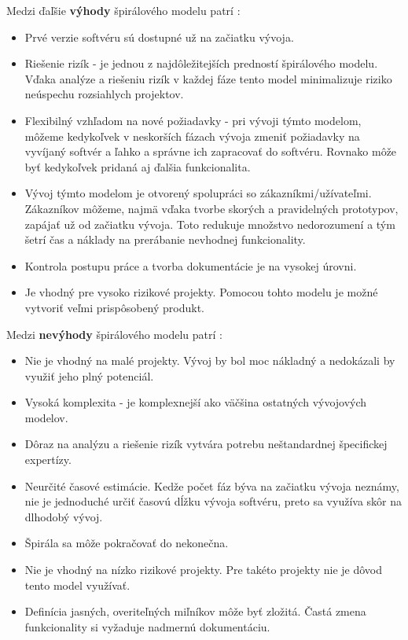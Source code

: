 \documentclass[10pt,twoside,slovak,a4paper]{article}
\begin{document}
Medzi ďaľšie \textbf{výhody} špirálového modelu patrí \cite{SpiralModelProsCons} :
\begin{itemize}
\item Prvé verzie softvéru sú dostupné už na začiatku vývoja.
\item Riešenie rizík - je jednou z najdôležitejších predností špirálového modelu. Vďaka analýze a riešeniu rizík v každej fáze tento model minimalizuje riziko neúspechu rozsiahlych projektov.
\item Flexibilný vzhľadom na nové požiadavky - pri vývoji týmto modelom, môžeme kedykoľvek v neskorších fázach vývoja zmeniť požiadavky na vyvíjaný softvér a ľahko a správne ich zapracovať do softvéru. Rovnako môže byť kedykoľvek pridaná aj ďalšia funkcionalita.
\item Vývoj týmto modelom je otvorený spolupráci so zákazníkmi/užívateľmi. Zákazníkov môžeme, najmä vďaka tvorbe skorých a pravidelných prototypov, zapájať už od začiatku vývoja. Toto redukuje množstvo nedorozumení a tým šetrí čas a náklady na prerábanie nevhodnej funkcionality.
\item Kontrola postupu práce a tvorba dokumentácie je na vysokej úrovni.
\item Je vhodný pre vysoko rizikové projekty. Pomocou tohto modelu je možné vytvoriť veľmi prispôsobený produkt.
\end{itemize}

\bigskip

Medzi  \textbf{nevýhody} špirálového modelu patrí \cite{SpiralModelProsCons} :
\begin{itemize}
\item Nie je vhodný na malé projekty. Vývoj by bol moc nákladný a nedokázali by využiť jeho plný potenciál.
\item Vysoká komplexita - je komplexnejší ako väčšina ostatných vývojových modelov.
\item Dôraz na analýzu a riešenie rizík vytvára potrebu neštandardnej špecifickej expertízy.
\item Neurčité časové estimácie. Kedže počet fáz býva na začiatku vývoja neznámy, nie je jednoduché určiť časovú dĺžku vývoja softvéru, preto sa využíva skôr na dlhodobý vývoj.
\item Špirála sa môže pokračovať do nekonečna.
\item Nie je vhodný na nízko rizikové projekty. Pre takéto projekty nie je dôvod tento model využívať.
\item Definícia jasných, overiteľných miľníkov môže byť zložitá. Častá zmena funkcionality si vyžaduje nadmernú dokumentáciu.
\end{itemize}
\end{document}
